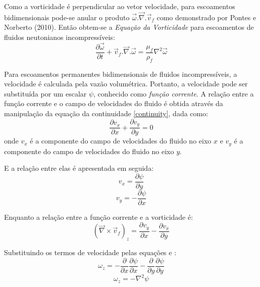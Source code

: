 Como a vorticidade é perpendicular ao vetor velocidade, para escoamentos bidimensionais pode-se anular o produto $\vec{\omega}.\vec{\nabla}.\vec{v}_f$ como demonstrado por Pontes e Norberto (2010)\cite{pontes_norberto}.
Então obtem-se a \textit{Equação da Vorticidade} para escoamentos de fluidos neutonianos incompressíveis:
\begin{equation}
	\dfrac{\partial \vec{\omega}}{\partial t} +
	\vec{v}_f.\vec{\nabla}.\vec{\omega} =
    \dfrac{\mu_f}{\rho_f} \nabla^2 \vec{\omega}
    \label{vorticity}
\end{equation}

Para escoamentos permanentes bidimensionais de fluidos incompressíveis, a velocidade é calculada pela vazão volumétrica.
Portanto, a velocidade pode ser substituída por um escalar $\psi$, conhecido como \textit{função corrente}.
A relação entre a função corrente e o campo de velocidades do fluido é obtida através da manipulação da equação da continuidade \eqref{continuity}, dada como:
\begin{equation}
	\dfrac{\partial v_x}{\partial x} +
	\dfrac{\partial v_y}{\partial y} =
	0
\end{equation}
onde $v_x$ é a componente do campo de velocidades do fluido no eixo $x$ e $v_y$ é a componente do campo de velocidades do fluido no eixo $y$.

E a relação entre elas é apresentada em seguida:
\begin{equation}
	v_x = \dfrac{\partial \psi}{\partial y}
	\label{corr_x}
\end{equation}
\begin{equation}
	v_y = -\dfrac{\partial \psi}{\partial x}
	\label{corr_y}
\end{equation}

Enquanto a relação entre a função corrente e a vorticidade é:
\begin{equation}
	(\vec{\nabla}\times\vec{v}_f)_z =
	\dfrac{\partial v_y}{\partial x} -
	\dfrac{\partial v_x}{\partial y}
\end{equation}

Substituindo os termos de velocidade pelas equações  e :
\begin{equation}
	\omega_z =
	-\dfrac{\partial}{\partial x}\dfrac{\partial \psi}{\partial x} -
	\dfrac{\partial}{\partial y}\dfrac{\partial \psi}{\partial y}
\end{equation}
\begin{equation}
	\omega_z =
	-\nabla^2\psi
	\label{corrente_vorticidade}
\end{equation}

